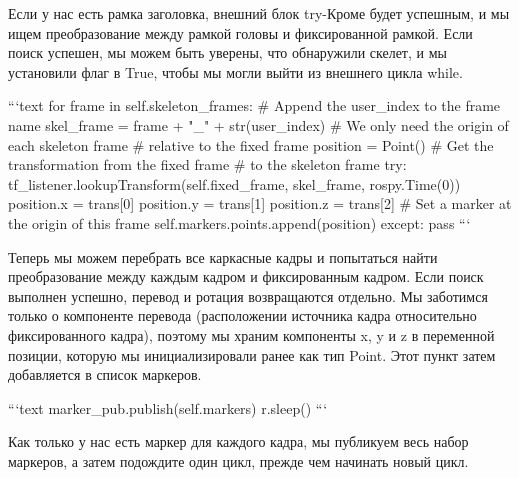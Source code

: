 Если у нас есть рамка заголовка, внешний блок try-Кроме будет успешным, и мы ищем преобразование между рамкой головы и фиксированной рамкой. Если поиск успешен, мы можем быть уверены, что обнаружили скелет, и мы установили флаг в True, чтобы мы могли выйти из внешнего цикла while.

```text
for frame in self.skeleton_frames:
# Append the user_index to the frame name
skel_frame = frame + "_" + str(user_index)
# We only need the origin of each skeleton frame
# relative to the fixed frame
position = Point()
# Get the transformation from the fixed frame
# to the skeleton frame
try:
tf_listener.lookupTransform(self.fixed_frame, skel_frame, rospy.Time(0))
position.x = trans[0]
position.y = trans[1]
position.z = trans[2]
# Set a marker at the origin of this frame
self.markers.points.append(position)
except:
pass
```

Теперь мы можем перебрать все каркасные кадры и попытаться найти преобразование между каждым кадром и фиксированным кадром. Если поиск выполнен успешно, перевод и ротация возвращаются отдельно. Мы заботимся только о компоненте перевода (расположении источника кадра относительно фиксированного кадра), поэтому мы храним компоненты x, y и z в переменной позиции, которую мы инициализировали ранее как тип Point. Этот пункт затем добавляется в список маркеров.

```text
marker_pub.publish(self.markers)
r.sleep()
```

Как только у нас есть маркер для каждого кадра, мы публикуем весь набор маркеров, а затем подождите один цикл, прежде чем начинать новый цикл.

